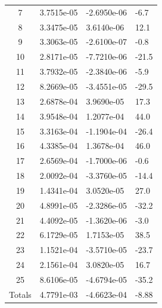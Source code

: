 \documentclass[t, pdftex]{beamer}
\begin{document}
\begin{frame}
\begin{columns}
\begin{column}{0.5\textwidth}
\begin{table}[h]
\begin{center}
\begin{tabular}[h]{|c|M|M|M|}
                7  &  3.7515e-05 & -2.6950e-06 &  -6.7 \\
                8  &  3.3475e-05 & 3.6140e-06 &  12.1 \\ 
                9  &  3.3063e-05 & -2.6100e-07 &  -0.8 \\
                10  & 2.8171e-05 & -7.7210e-06 &  -21.5 \\
                11  & 3.7932e-05 & -2.3840e-06 &  -5.9 \\
                12  & 8.2669e-05 & -3.4551e-05 &  -29.5 \\
                13  & 2.6878e-04 & 3.9690e-05 &  17.3 \\ 
                14  & 3.9548e-04 & 1.2077e-04 &  44.0 \\ 
                15  & 3.3163e-04 & -1.1904e-04 &  -26.4 \\
                16  & 4.3385e-04 & 1.3678e-04 &  46.0 \\ 
                17  & 2.6569e-04 & -1.7000e-06 &  -0.6 \\
                18  & 2.0092e-04 & -3.3760e-05 &  -14.4 \\
                19  & 1.4341e-04 & 3.0520e-05 &  27.0 \\ 
                20  & 4.8991e-05 & -2.3286e-05 &  -32.2 \\
                21  & 4.4092e-05 & -1.3620e-06 &  -3.0 \\
                22  & 6.1729e-05 & 1.7153e-05 &  38.5 \\ 
                23  & 1.1521e-04 & -3.5710e-05 &  -23.7 \\
                24  & 2.1561e-04 & 3.0820e-05 &  16.7 \\ 
                25  & 8.6106e-05 & -4.6794e-05 &  -35.2 \\
                \hline \hline
                Totals & 4.7791e-03 & -4.6623e-04   & -8.88 \\
                \hline
            \end{tabular}
            \label{tab:loo_crud_bmass}
        \end{center}
    \end{table}
    \end{column}
\end{columns}
\end{frame}
\end{document}
